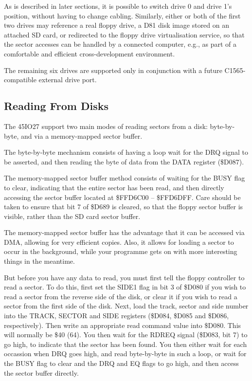 As is described in later sections, it is possible to switch drive 0
and drive 1's position, without having to change cabling. Similarly,
either or both of the first two drives may reference a real floppy
drive, a D81 disk image stored on an attached SD card, or redirected
to the floppy drive virtualisation service, so that the sector
accesses can be handled by a connected computer, e.g., as part of a
comfortable and efficient cross-development environment.

The remaining six drives are supported only in conjunction with a
future C1565-compatible external drive port.

\subsection{Reading From Disks}

The 45IO27 support two main modes of reading sectors from a
disk: byte-by-byte, and via a memory-mapped sector buffer.

The byte-by-byte mechanism consists of having a loop wait for the DRQ
signal to be asserted, and then reading the byte of data from the DATA
register (\$D087).

The memory-mapped sector buffer method consists of waiting for the
BUSY flag to clear, indicating that the entire sector has been read,
and then directly accessing the sector buffer located at \$FFD6C00 --
\$FFD6DFF. Care should be taken to ensure that bit 7 of \$D689 is
cleared, so that the floppy sector buffer is visible, rather than the
SD card sector buffer.

The memory-mapped sector buffer has the advantage that it can be
accessed via DMA, allowing for very efficient copies.  Also, it allows
for loading a sector to occur in the background, while your programme
gets on with more interesting things in the meantime.

But before you have any data to read, you must first tell the floppy
controller to read a sector.  To do this, first set the SIDE1 flag in
bit 3 of \$D080 if you wish to read a sector from the reverse side of the disk,
or clear it if you wish to read a sector from the first side of the
disk.
Next, load the track, sector and
side number into the TRACK, SECTOR and SIDE registers (\$D084, \$D085
and \$D086, respectively). Then write an appropriate read command
value into \$D080.  This will normally be \$40 (64).  You then wait
for the RDREQ signal (\$D083, bit 7) to go high, to indicate that the
sector has been found. You then either wait for each occassion when
DRQ goes high, and read byte-by-byte in such a loop, or wait for the
BUSY flag to clear and the DRQ and EQ flags to go high, and then
access the sector buffer directly.  

